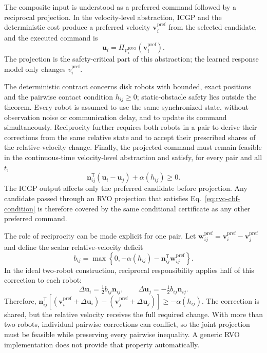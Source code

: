 \documentclass[pdflatex,sn-mathphys-num]{sn-jnl}
\begin{document}
The composite input is understood as a preferred command followed by a reciprocal projection. In the velocity-level abstraction, ICGP and the deterministic cost produce a preferred velocity $\mathbf{v}_i^{\mathrm{pref}}$ from the selected candidate, and the executed command is
\begin{equation}
\mathbf{u}_i=\Pi_{\mathcal{V}_i^{\mathrm{RVO}}}\left(\mathbf{v}_i^{\mathrm{pref}}\right).
\label{eq:composite-input}
\end{equation}
The projection is the safety-critical part of this abstraction; the learned response model only changes $v_i^{\mathrm{pref}}$.

The deterministic contract concerns disk robots with bounded, exact positions and the pairwise contact condition $h_{ij}\geq0$; static-obstacle safety lies outside the theorem. Every robot is assumed to use the same synchronized state, without observation noise or communication delay, and to update its command simultaneously. Reciprocity further requires both robots in a pair to derive their corrections from the same relative state and to accept their prescribed shares of the relative-velocity change. Finally, the projected command must remain feasible in the continuous-time velocity-level abstraction and satisfy, for every pair and all $t$,
\begin{equation}
 \mathbf{n}_{ij}^{\mathsf T}(\mathbf{u}_i-\mathbf{u}_j)+\alpha(h_{ij})\geq0.
\label{eq:rvo-cbf-condition}
\end{equation}
The ICGP output affects only the preferred candidate before projection. Any candidate passed through an RVO projection that satisfies Eq.~\ref{eq:rvo-cbf-condition} is therefore covered by the same conditional certificate as any other preferred command.

The role of reciprocity can be made explicit for one pair. Let $\mathbf{w}_{ij}^{\mathrm{pref}}=\mathbf{v}_i^{\mathrm{pref}}-\mathbf{v}_j^{\mathrm{pref}}$ and define the scalar relative-velocity deficit
\begin{equation}
b_{ij}=\max\left\{0,-\alpha(h_{ij})-\mathbf{n}_{ij}^{\mathsf T}\mathbf{w}_{ij}^{\mathrm{pref}}\right\}.
\label{eq:relative-deficit}
\end{equation}
In the ideal two-robot construction, reciprocal responsibility applies half of this correction to each robot:
\begin{equation}
\Delta\mathbf{u}_i=\tfrac{1}{2}b_{ij}\mathbf{n}_{ij},\qquad
\Delta\mathbf{u}_j=-\tfrac{1}{2}b_{ij}\mathbf{n}_{ij}.
\label{eq:reciprocal-correction}
\end{equation}
Therefore, $\mathbf{n}_{ij}^{\mathsf T}[(\mathbf{v}_i^{\mathrm{pref}}+\Delta\mathbf{u}_i)-(\mathbf{v}_j^{\mathrm{pref}}+\Delta\mathbf{u}_j)]\geq-\alpha(h_{ij})$. The correction is shared, but the relative velocity receives the full required change. With more than two robots, individual pairwise corrections can conflict, so the joint projection must be feasible while preserving every pairwise inequality. A generic RVO implementation does not provide that property automatically.
\end{document}
